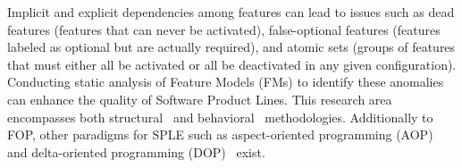 Implicit and explicit dependencies among features can lead to issues such as dead features (features that can never be activated), false-optional features (features labeled as optional but are actually required), and atomic sets (groups of features that must either all be activated or all be deactivated in any given configuration). Conducting static analysis of Feature Models (FMs) to identify these anomalies can enhance the quality of Software Product Lines. This research area encompasses both structural~\cite{TerBeek21} and behavioral~\cite{Benavides10} methodologies.
 Additionally to FOP, other paradigms for SPLE such as aspect-oriented programming (AOP)~\cite{Groher09} and delta-oriented programming (DOP)~\cite{Koscielny14} exist.



















